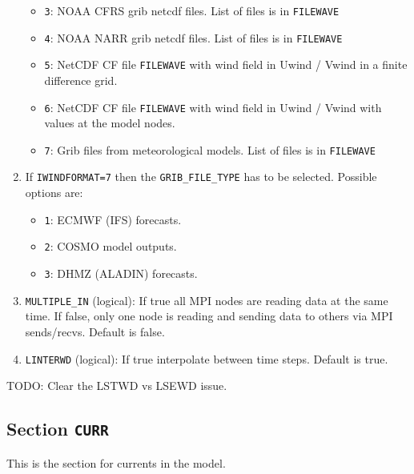 \documentclass[12pt]{amsart}
\begin{document}
\begin{enumerate}
\begin{itemize}
  \item {\tt 3}: NOAA CFRS grib netcdf files. List of files is in {\tt FILEWAVE}
  \item {\tt 4}: NOAA NARR grib netcdf files. List of files is in {\tt FILEWAVE}
  \item {\tt 5}: NetCDF CF file {\tt FILEWAVE} with wind field in Uwind / Vwind in a finite difference grid.
  \item {\tt 6}: NetCDF CF file {\tt FILEWAVE} with wind field in Uwind / Vwind with values at the model nodes.
  \item {\tt 7}: Grib files from meteorological models. List of files is in {\tt FILEWAVE}
  \end{itemize}
\item If {\tt IWINDFORMAT=7} then the {\tt GRIB\_FILE\_TYPE} has to be selected. Possible options are:
  \begin{itemize}
  \item {\tt 1}: ECMWF (IFS) forecasts.
  \item {\tt 2}: COSMO model outputs.
  \item {\tt 3}: DHMZ (ALADIN) forecasts.
  \end{itemize}
\item {\tt MULTIPLE\_IN} (logical): If true all MPI nodes are reading data at the same time. If false, only one node is reading and sending data to others via MPI sends/recvs. Default is false.
\item {\tt LINTERWD} (logical): If true interpolate between time steps. Default is true.
  
\end{enumerate}
TODO: Clear the LSTWD vs LSEWD issue.





\subsection{Section {\tt CURR}}
This is the section for currents in the model.
\end{document}
